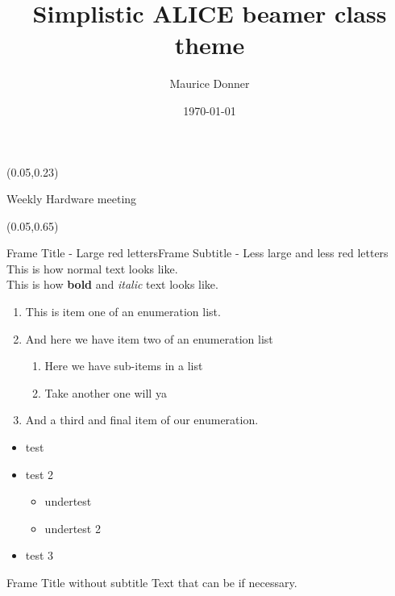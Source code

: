 \documentclass[usenames,dvipsnames,11pt,aspectratio=169]{beamer}
\title[ALICE Theme]{Simplistic ALICE beamer class theme}
\date[\today]{\small\today}
\author{Maurice Donner}
\newcommand{\meetingtitle}[1]{\begin{textblock*}{0.9\paperwidth}
(0.05\paperwidth,0.23\paperheight){\begin{center}#1\end{center}}\end{textblock*}}
\newcommand{\smalltitle}[1]{\begin{textblock*}{0.9\paperwidth}
(0.05\paperwidth,0.65\paperheight){\begin{center}\usebeamerfont{title}\LARGE
\color{ARed}{#1}\end{center}}\end{textblock*}}
\begin{document}
\begin{frame}[fragile] %
\thispagestyle{empty}
\titlepage
\meetingtitle{Weekly Hardware meeting}
\smalltitle{- Full template -}
\end{frame}


\begin{frame}{Frame Title - Large red letters}{Frame Subtitle - Less large and less red letters}
    This is how normal text looks like.\\
    This is how \textbf{bold} and \textit{italic} text looks like.
    \begin{enumerate}
	\item This is item one of an enumeration list.
	\item And here we have item two of an enumeration list
	    \begin{enumerate}
	    \item Here we have sub-items in a list
	    \item Take another one will ya
	    \end{enumerate}
	\item And a third and final item of our enumeration.
    \end{enumerate}
    \begin{itemize}
	\item test
	\item test 2
	\begin{itemize}
	    \item undertest
	    \item undertest 2
	\end{itemize}
	\item test 3
    \end{itemize}
\end{frame}


\begin{frame}{Frame Title without subtitle}
    Text that can be  if necessary.
\end{frame}


\end{document}
